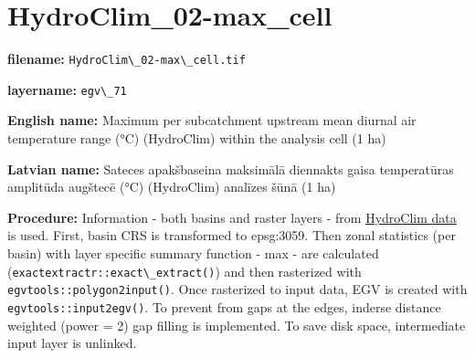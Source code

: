 \documentclass[
]{book}
\newcommand{\passthrough}[1]{#1}
\begin{document}
\section{HydroClim\_02-max\_cell}\label{ch06.071}

\textbf{filename:} \passthrough{\lstinline!HydroClim\_02-max\_cell.tif!}

\textbf{layername:} \passthrough{\lstinline!egv\_71!}

\textbf{English name:} Maximum per subcatchment upstream mean diurnal air temperature range (°C) (HydroClim) within the analysis cell (1 ha)

\textbf{Latvian name:} Sateces apakšbaseina maksimālā diennakts gaisa temperatūras amplitūda augštecē (°C) (HydroClim) analīzes šūnā (1 ha)

\textbf{Procedure:} Information - both basins and raster layers - from \hyperref[Ch04.12]{HydroClim data}
is used. First, basin CRS is transformed to epsg:3059. Then zonal statistics (per basin) with
layer specific summary function - max - are calculated (\passthrough{\lstinline!exactextractr::exact\_extract()!})
and then rasterized with \passthrough{\lstinline!egvtools::polygon2input()!}. Once rasterized to input data,
EGV is created with \passthrough{\lstinline!egvtools::input2egv()!}. To prevent from gaps at the edges,
inderse distance weighted (power = 2) gap filling is implemented. To save disk space,
intermediate input layer is unlinked.
\end{document}
